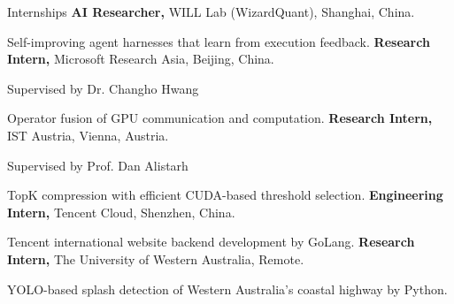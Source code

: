 \begin{rubric}{Internships}
%
	\textbf{AI Researcher,} WILL Lab (\mbox{WizardQuant}), Shanghai, China.
	\par Self-improving agent harnesses that learn from execution feedback.
%
%
	\textbf{Research Intern,} Microsoft Research Asia, Bei{}jing, China.
	\par Supervised by Dr. Changho Hwang
	\par Operator fusion of GPU communication and computation.
%
%
	\textbf{Research Intern,} IST Austria, Vienna, Austria.
	\par Supervised by Prof. Dan Alistarh
	\par TopK compression with efficient CUDA-based threshold selection.
%
%
	\textbf{Engineering Intern,} Tencent Cloud, Shenzhen, China.
	\par Tencent international website backend development by GoLang.
%
%
	\textbf{Research Intern,} The University of Western Australia, Remote.
	\par YOLO-based splash detection of Western Australia's coastal highway by Python.
\end{rubric}